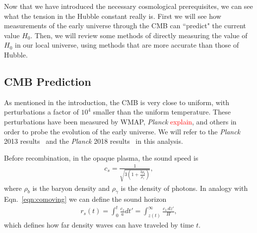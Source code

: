 \documentclass[12pt]{article}
\renewcommand{\l}{\ell}
\newcommand{\ex}[1]{\left\langle#1\right\rangle}
\renewcommand{\th}[1]{\frac{1}{#1}}
\newcommand{\note}[1]{\textcolor{red}{#1}}
\newcommand{\Planck}[1]{\textit{Planck}}
\begin{document}
Now that we have introduced the necessary cosmological prerequisites, we can see what the tension in the Hubble constant really is. First we will see how measurements of the early universe through the CMB can ``predict" the current value $H_0$. Then, we will review some methods of directly measuring the value of $H_0$ in our local universe, using methods that are more accurate than those of Hubble.

\subsection{CMB Prediction} \label{sub:predic}

As mentioned in the introduction, the CMB is very close to uniform, with perturbations a factor of $10^4$ smaller than the uniform temperature. These perturbations have been measured by WMAP, \Planck{} \note{explain}, and others in order to probe the evolution of the early universe. We will refer to the \Planck{} 2013 results~\cite{Planck2013} and the \Planck{} 2018 results~\cite{Planck2018} in this analysis.
%
%

Before recombination, in the opaque plasma, the sound speed is 
\begin{align}
c_s = \th{\sqrt{3(1+\frac{3\rho_b}{\rho_\gamma})}},
\end{align}
where $\rho_b$ is the baryon density and $\rho_\gamma$ is the density of photons. In analogy with Eqn.~\ref{eqn:comoving} we can define the sound horizon~\cite{Planck2013}
\begin{align}
r_s(t) = \int_0^t \frac{c_s}{a} dt' = \int_{z(t) }^\infty \frac{c_s\, dz'}{H}, \label{eqn:rs}
\end{align}
which defines how far density waves can have traveled by  time $t$. 
\end{document}
